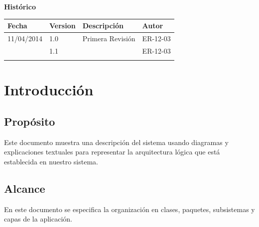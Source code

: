 \documentclass[12pt, a4paper, titlepage]{article}
\begin{document}
\begin{titlepage}
\vspace{2cm}

\begin{center}
	\large{\textbf{Histórico}}
	
    \begin{tabular}{ | p{4cm} | p{2cm} | p{6cm} | p{3cm} |}
    \hline
    \textbf{Fecha} & \textbf{Version} & \textbf{Descripción} & \textbf{Autor} \\ \hline
      11/04/2014 & 1.0 & Primera Revisión & ER-12-03\\ \hline
      & 1.1 &  & ER-12-03\\ \hline
     &  & &\\ \hline
    \end{tabular}
\end{center}


\end{titlepage}
\clearpage


\tableofcontents
\clearpage

\section{Introducción}

\subsection{Propósito}

Este documento muestra una descripción del sistema usando diagramas y explicaciones textuales para representar la arquitectura lógica que está establecida en nuestro sistema.

\subsection{Alcance}

En este documento se especifica la organización en clases, paquetes, subsistemas y capas de la aplicación.
\end{document}
